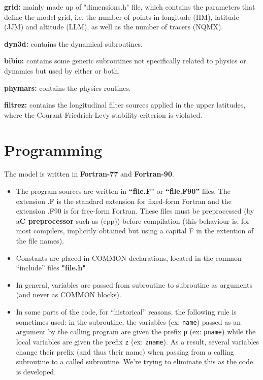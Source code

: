 \begin{description}
\item{\bf grid:} mainly made up of "dimensions.h" file,
which contains the parameters that define the model grid,
i.e. the number of points in longitude (IIM), latitude (JJM) and altitude
(LLM), as well as the number of tracers (NQMX).

\item{\bf dyn3d:} contains the dynamical subroutines.

\item{\bf bibio:} contains some generic subroutines not specifically
related to physics or dynamics but used by either or both.

\item{\bf phymars:} contains the physics routines.

\item{\bf filtrez:} contains the longitudinal filter sources applied in the
upper latitudes,
where the Courant-Friedrich-Levy stability criterion is violated.

\end{description}

\section{Programming}

The model is written in {\bf Fortran-77} and {\bf Fortran-90}.
\begin{itemize}
\item The program sources are written in {\bf ``file.F"}
or {\bf ``file.F90''} files.
The extension .F is the standard extension for fixed-form Fortran and
the extension .F90 is for free-form Fortran.
These files must be preprocessed (by a{\bf C preprocessor}
such as (cpp)) before compilation (this behaviour is, for most
compilers, implicitly obtained but using a capital F in the extention
of the file names).

\item Constants are placed in COMMON declarations,
located in the common ``include'' files {\bf "file.h"}

\item In general, variables are passed from subroutine to subroutine
as arguments (and never as COMMON blocks).

\item In some parts of the code, for ``historical'' reasons,
the following rule is sometimes used: in the subroutine,
the variables (ex: \verb+name+) passed as an argument by the calling program
are given the prefix \verb+p+ (ex: \verb+pname+)
 while the local variables are given the prefix \verb+z+ (ex: \verb+zname+).
As a result, several variables change their prefix (and thus their name)
when passing from a calling subroutine to a called subroutine. We're trying to eliminate this as the code is developed.
\end{itemize}

